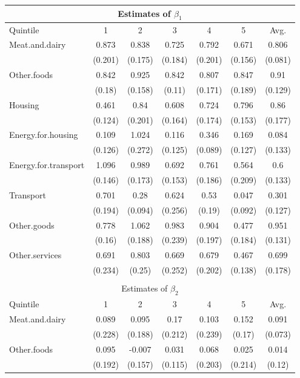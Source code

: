 \begin{tabular}{lcccccc}

\multicolumn{7}{c}{Estimates of $\beta_1$} \\ 
  \hline
Quintile & 1 & 2 & 3 & 4 & 5 & Avg. \\ 
  \hline
Meat.and.dairy & 0.873 & 0.838 & 0.725 & 0.792 & 0.671 & 0.806 \\ 
   & (0.201) & (0.175) & (0.184) & (0.201) & (0.156) & (0.081) \\ 
  Other.foods & 0.842 & 0.925 & 0.842 & 0.807 & 0.847 & 0.91 \\ 
   & (0.18) & (0.158) & (0.11) & (0.171) & (0.189) & (0.129) \\ 
  Housing & 0.461 & 0.84 & 0.608 & 0.724 & 0.796 & 0.86 \\ 
   & (0.124) & (0.201) & (0.164) & (0.174) & (0.153) & (0.177) \\ 
  Energy.for.housing & 0.109 & 1.024 & 0.116 & 0.346 & 0.169 & 0.084 \\ 
   & (0.126) & (0.272) & (0.125) & (0.089) & (0.127) & (0.133) \\ 
  Energy.for.transport & 1.096 & 0.989 & 0.692 & 0.761 & 0.564 & 0.6 \\ 
   & (0.146) & (0.173) & (0.153) & (0.186) & (0.209) & (0.133) \\ 
  Transport & 0.701 & 0.28 & 0.624 & 0.53 & 0.047 & 0.301 \\ 
   & (0.194) & (0.094) & (0.256) & (0.19) & (0.092) & (0.127) \\ 
  Other.goods & 0.778 & 1.062 & 0.983 & 0.904 & 0.477 & 0.951 \\ 
   & (0.16) & (0.188) & (0.239) & (0.197) & (0.184) & (0.131) \\ 
  Other.services & 0.691 & 0.803 & 0.669 & 0.679 & 0.467 & 0.699 \\ 
   & (0.234) & (0.25) & (0.252) & (0.202) & (0.138) & (0.178) \\
   \hline\\
\multicolumn{7}{c}{Estimates of $\beta_2$} \\ 
   \hline
Quintile & 1 & 2 & 3 & 4 & 5 & Avg. \\ 
  \hline
Meat.and.dairy & 0.089 & 0.095 & 0.17 & 0.103 & 0.152 & 0.091 \\ 
   & (0.228) & (0.188) & (0.212) & (0.239) & (0.17) & (0.073) \\ 
  Other.foods & 0.095 & -0.007 & 0.031 & 0.068 & 0.025 & 0.014 \\ 
   & (0.192) & (0.157) & (0.115) & (0.203) & (0.214) & (0.12) \\ 

\end{tabular}
